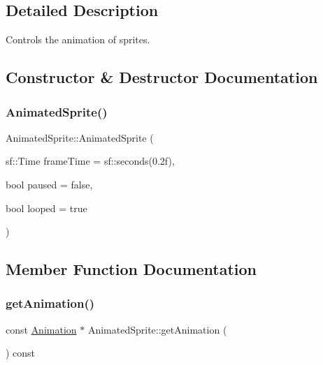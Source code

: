 \subsection{Detailed Description}
Controls the animation of sprites. 



\subsection{Constructor \& Destructor Documentation}
\mbox{\label{class_animated_sprite_a097ab8444824e7085d71a1f7144e7763}} 
\subsubsection{\texorpdfstring{Animated\+Sprite()}{AnimatedSprite()}}
{\footnotesize\ttfamily Animated\+Sprite\+::\+Animated\+Sprite (\begin{DoxyParamCaption}\item[{sf\+::\+Time}]{frame\+Time = {\ttfamily sf\+:\+:seconds(0.2f)},  }\item[{bool}]{paused = {\ttfamily false},  }\item[{bool}]{looped = {\ttfamily true} }\end{DoxyParamCaption})\hspace{0.3cm}{\ttfamily [explicit]}}



\subsection{Member Function Documentation}
\mbox{\label{class_animated_sprite_a03bacdbaf638cb6f7987e342980206c2}} 
\subsubsection{\texorpdfstring{get\+Animation()}{getAnimation()}}
{\footnotesize\ttfamily const \hyperlink{class_animation}{Animation} $\ast$ Animated\+Sprite\+::get\+Animation (\begin{DoxyParamCaption}{ }\end{DoxyParamCaption}) const}

